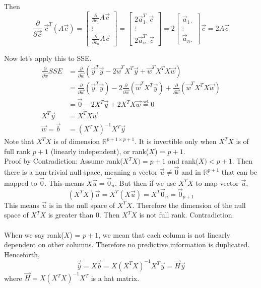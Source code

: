 \documentclass[12pt]{article}
\begin{document}
\begin{itemize}
Then $$ \frac{\partial}{\partial \vec{c}}~ \vec{c}^T(A\vec{c}) = \begin{bmatrix} \frac{\partial}{\partial c_1} A\vec{c} \\ \vdots \\ \frac{\partial}{\partial c_n} A\vec{c} \end{bmatrix} = \begin{bmatrix} 2\vec{a}_{1\cdot}^T\vec{c} \\ \vdots \\ 2\vec{a}_{n\cdot}^T\vec{c} \end{bmatrix} = 2\begin{bmatrix} \vec{a}_{1\cdot} \\ \vdots \\ \vec{a}_{n\cdot} \end{bmatrix} \vec{c} = 2A\vec{c}$$ \end{itemize} 
Now let's apply this to SSE. 
$$ \begin{aligned} \frac{\partial}{\partial \vec{w}} SSE &= \frac{\partial}{\partial \vec{w}} (\vec{y}^T\vec{y} - 2\vec{w}^TX^T\vec{y} + \vec{w}^TX^TX\vec{w}) \\ &= \frac{\partial}{\partial \vec{w}} (\vec{y}^T\vec{y}) - 2\frac{\partial}{\partial \vec{w}} (\vec{w}^TX^T\vec{y}) + \frac{\partial}{\partial \vec{w}} (\vec{w}^TX^TX\vec{w}) \\ &= \vec{0} - 2X^T\vec{y} + 2X^TX\vec{w} \stackrel{\text{set}}{=} 0 \\ X^T\vec{y} &= X^TX\vec{w} \\ \vec{w} = \vec{b} &= (X^TX)^{-1}X^T\vec{y} \end{aligned} $$ 
Note that $X^TX$ is of dimension $\mathbb{R}^{p+1 \times p+1}$. It is invertible only when
$X^TX$ is of full rank $p+1$ (linearly independent), or rank($X$) = $p+1$. \\
Proof by Contradiction: Assume rank($X^TX) = p+1$ and rank($X) < p+1$. Then there is a non-trivial null space, meaning a vector $\vec{u} \neq \vec{0}$ and in $\mathbb{R}^{p+1}$ that can be mapped to $\vec{0}$. This means $X\vec{u} = \vec{0}_n$. But then if we use $X^TX$ to map vector $\vec{u}$, 
$$ (X^TX)\vec{u} = X^T(X\vec{u}) = X^T\vec{0}_n = \vec{0}_{p+1}$$ This means $\vec{u}$ is in the null space of $X^TX$. Therefore the dimension of the null space of $X^TX$ is greater than $0$. Then $X^TX$ is not full rank. Contradiction. \\~\\
When we say rank($X$) = $p+1$, we mean that each column is not linearly dependent on other columns. Therefore no predictive information is duplicated. \\
Henceforth, $$\vec{\hat{y}} = X\vec{b} = X(X^TX)^{-1}X^T\vec{y} = \vec{H}\vec{y}$$ 
where $\vec{H} = X(X^TX)^{-1}X^T$ is a hat matrix. 
\end{document}
